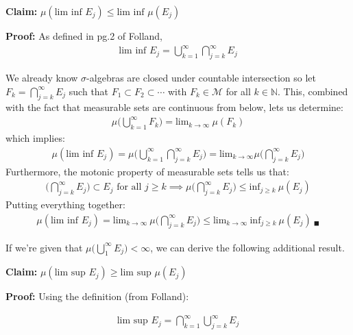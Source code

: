 \documentclass[11pt,letter]{article}
\begin{document}
\begin{enumerate}
    \textbf{Claim:} $\mu(\text{lim inf } E_j) \le \text{lim inf }\mu(E_j)$

    \textbf{Proof:} As defined in pg.2 of Folland,
    \begin{align*}
        \text{lim inf } E_j = \bigcup\limits_{k=1}^\infty \bigcap\limits_{j=k}^\infty E_j
    \end{align*}

    We already know $\sigma$-algebras are closed under countable intersection so let $F_k = \bigcap_{j=k}^\infty E_j$ such that $F_1 \subset F_2 \subset \cdots$ with $F_k \in \mathcal{M}$ for all $k \in \mathbb{N}$. This, combined with the fact that measurable sets are continuous from below, lets us determine:
    \begin{align*}
        \mu \Big( \bigcup\limits_{k=1}^\infty F_k \Big) = \text{lim}_{k \rightarrow \infty} \ \mu (F_k)
    \end{align*}
    which implies:
    \begin{align*}
        \mu (\text{lim inf } E_j) = \mu \Big(\bigcup\limits_{k=1}^\infty \bigcap\limits_{j=k}^\infty E_j \Big) = \text{lim}_{k \rightarrow \infty} \mu \Big( \bigcap\limits_{j=k}^\infty E_j \Big)
    \end{align*}
    Furthermore, the motonic property of measurable sets tells us that:
    \begin{align*}
        \Big( \bigcap\limits_{j=k}^\infty E_j \Big) \subset E_j \text{ for all } j \ge k \implies \mu \Big( \bigcap\limits_{j=k}^\infty E_j \Big) \le \text{inf}_{j \ge k} \ \mu(E_j)
    \end{align*}
    Putting everything together:
    \begin{align*}
        \mu (\text{lim inf } E_j) = \text{lim}_{k \rightarrow \infty} \ \mu \Big( \bigcap\limits_{j=k}^\infty E_j \Big) \le \text{lim}_{k \rightarrow \infty} \ \text{inf}_{j \ge k} \ \mu(E_j) \ _\blacksquare
    \end{align*}

    If we're given that $\mu \big( \bigcup_1^\infty E_j \big) < \infty$, we can derive the following additional result.

    \textbf{Claim:} $\mu(\text{lim sup } E_j) \ge \text{lim sup }\mu(E_j)$
    
    \textbf{Proof:} Using the definition (from Folland):

    \begin{align*}
        \text{lim sup } E_j = \bigcap\limits_{k=1}^\infty \bigcup\limits_{j=k}^\infty E_j
    \end{align*}


\end{enumerate}
\end{document}

